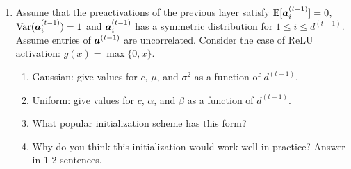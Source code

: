 {\begin{enumerate}
\item Assume that the preactivations of the previous layer satisfy $\mathbb{E}[{\bm{a}}^{(t-1)}_i]=0$, $\mathrm{Var}({\bm{a}}^{(t-1)}_i)=1$ and ${\bm{a}}_i^{(t-1)}$ has a symmetric distribution for $1\leq i\leq d^{(t-1)}$.
Assume entries of ${\bm{a}}^{(t-1)}$ are uncorrelated. 
Consider the case of ReLU activation: $g(x)=\max\{0,x\}$. 
\begin{enumerate}
    \item Gaussian: give values for $c$, $\mu$, and $\sigma^2$ as a function of $d^{(t-1)}$.
    \item Uniform: give values for $c$, $\alpha$, and $\beta$ as a function of $d^{(t-1)}$.
    \item What popular initialization scheme has this form?
    \item Why do you think this initialization would work well in practice? Answer in 1-2 sentences. %
\end{enumerate}
\end{enumerate}

}

\Answer{
${}$%
}
